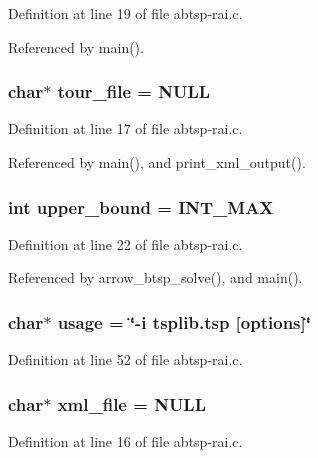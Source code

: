 Definition at line 19 of file abtsp-rai.c.

Referenced by main().\hypertarget{abtsp-rai_8c_b818a82f867be75d7c4d92d792b0943e}{
\subsubsection{\setlength{\rightskip}{0pt plus 5cm}char$\ast$ {\bf tour\_\-file} = NULL}}
\label{abtsp-rai_8c_b818a82f867be75d7c4d92d792b0943e}




Definition at line 17 of file abtsp-rai.c.

Referenced by main(), and print\_\-xml\_\-output().\hypertarget{abtsp-rai_8c_f5a34eb1d01ffd792adcadc9627ffcb8}{
\subsubsection{\setlength{\rightskip}{0pt plus 5cm}int {\bf upper\_\-bound} = INT\_\-MAX}}
\label{abtsp-rai_8c_f5a34eb1d01ffd792adcadc9627ffcb8}




Definition at line 22 of file abtsp-rai.c.

Referenced by arrow\_\-btsp\_\-solve(), and main().\hypertarget{abtsp-rai_8c_adebe2487a2c5240ab6cd02c83add0bf}{
\subsubsection{\setlength{\rightskip}{0pt plus 5cm}char$\ast$ {\bf usage} = \char`\"{}-i tsplib.tsp \mbox{[}{\bf options}\mbox{]}\char`\"{}}}
\label{abtsp-rai_8c_adebe2487a2c5240ab6cd02c83add0bf}




Definition at line 52 of file abtsp-rai.c.\hypertarget{abtsp-rai_8c_bf4e392494984c6ef8259268eb1fe421}{
\subsubsection{\setlength{\rightskip}{0pt plus 5cm}char$\ast$ {\bf xml\_\-file} = NULL}}
\label{abtsp-rai_8c_bf4e392494984c6ef8259268eb1fe421}




Definition at line 16 of file abtsp-rai.c.
